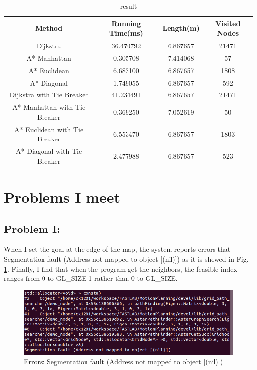 \documentclass[conference]{IEEEtran}
\begin{document}
\begin{table}[htbp]
	\caption{result}
	\centering 
	\begin{tabular}{cccc} %
		\toprule
		 Method & Running Time(ms) & Length(m) & Visited Nodes \\
		\midrule
		Dijkstra &  36.470792 & 6.867657  & 21471  \\
		A* Manhattan &  0.305708 & 7.414068  & 57  \\
		A* Euclidean & 6.683100 & 6.867657  & 1808  \\
		A* Diagonal & 1.749055 & 6.867657  & 592   \\
		Dijkstra with Tie Breaker & 41.234491 & 6.867657  & 21471   \\
		A* Manhattan with Tie Breaker & 0.369250 & 7.052619  & 50 \\
		A* Euclidean with Tie Breaker & 6.553470 & 6.867657  & 1803 \\
		A* Diagonal with Tie Breaker & 2.477988 & 6.867657  & 523 \\
		\bottomrule
	\end{tabular}
	\label{tbl:table1}
\end{table}

\section{Problems I meet}
\subsection{Problem I:}
When I set the goal at the edge of the map, the system reports errors that Segmentation fault (Address not mapped to object [(nil)]) as it is showed in Fig. \ref{fig:label5_1}. Finally, I find that when the program get the neighbors, the feasible index ranges from 0 to GL\_SIZE-1 rather than 0 to GL\_SIZE.

\begin{figure}[htbp]
	\centering
	\includegraphics[scale=0.35]{figs/fig5_1.png}
	\caption{Errors: Segmentation fault (Address not mapped to object [(nil)])}
	\label{fig:label5_1}
\end{figure}
\end{document}
